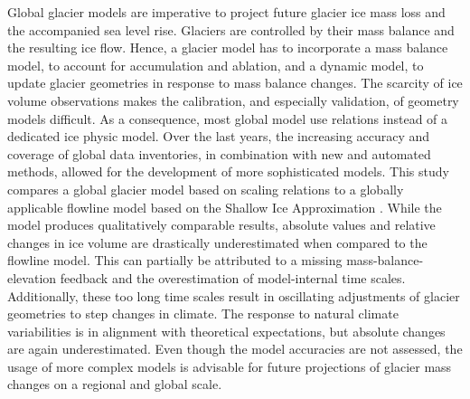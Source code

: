Global glacier models are imperative to project future glacier ice mass loss and the accompanied sea level rise. Glaciers are controlled by their mass balance and the resulting ice flow. Hence, a glacier model has to incorporate a mass balance model, to account for accumulation and ablation, and a dynamic model, to update glacier geometries in response to mass balance changes. The scarcity of ice volume observations makes the calibration, and especially validation, of geometry models difficult. As a consequence, most global model use \vas{} relations instead of a dedicated ice physic model.
Over the last years, the increasing accuracy and coverage of global data inventories, in combination with new and automated methods, allowed for the development of more sophisticated models. This study compares a global glacier model based on scaling relations \citep{Marzeion2012b} to a globally applicable flowline model based on the Shallow Ice Approximation \citep{Maussion2019}.
While the \vas{} model produces qualitatively comparable results, absolute values and relative changes in ice volume are drastically underestimated when compared to the flowline model. This can partially be attributed to a missing mass-balance-elevation feedback and the overestimation of model-internal time scales. Additionally, these too long time scales result in oscillating adjustments of glacier geometries to step changes in climate. The response to natural climate variabilities is in alignment with theoretical expectations, but absolute changes are again underestimated. Even though the model accuracies are not assessed, the usage of more complex models is advisable for future projections of glacier mass changes on a regional and global scale.
